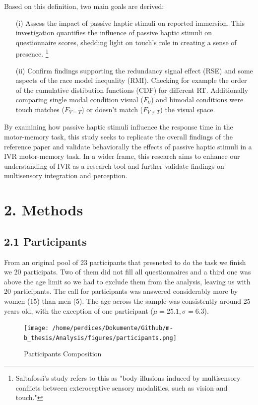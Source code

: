 \documentclass[12pt,oneside,openright]{report}
\begin{document}
Based on this definition, two main goals are derived:
\begin{itemize}
  \item[(i)] Assess the impact of passive haptic stimuli on reported immersion. This investigation quantifies the influence of passive haptic stimuli on questionnaire scores, shedding light on touch's role in creating a sense of presence. 
  \footnote{Saltafossi's study refers to this as "body illusions induced by multisensory conflicts between exteroceptive sensory modalities, such as vision and touch."}
    
  \item[(ii)] Confirm findings supporting the redundancy signal effect (RSE) and some aspects of the race model inequality (RMI). Checking for example the order of the cumulative distibution functions (CDF) for different RT. Additionally comparing single modal condition visual ($F_V$) and bimodal conditions were touch matches ($F_{V=T}$) or doesn’t match ($F_{V \neq T}$) the visual space. 
\end{itemize}

By examining how passive haptic stimuli influence the response time in the motor-memory task, this study seeks to replicate the overall findings of the reference paper \parencite*{SALTAFOSSI2023108642} and validate behaviorally the effects of passive haptic stimuli in a IVR motor-memory task. In a wider frame, this research aims to enhance our understanding of IVR as a research tool and further validate findings on multisensory integration and perception.

\section*{2. Methods}
    \subsection*{2.1 Participants}
    From an original pool of 23 participants that presneted to do the task we finish we 20 participats. Two of them did not fill all questionnaires and a third one was above the age limit  so we had to exclude them from the analysis, leaving us with 20 participants. The call for participants was answered considerably more by women (15) than men (5). The age across the sample was consistently around 25 years old, with the exception of one participant ($\mu=25.1 , \sigma=6.3$).
    \begin{figure}[h]
        \centering
        \texttt{[image: /home/perdices/Dokumente/Github/m-b\_thesis/Analysis/figures/participants.png]}
        \caption{Participants Composition}
        \label{fig:mesh1}
    \end{figure}
    
\end{document}
